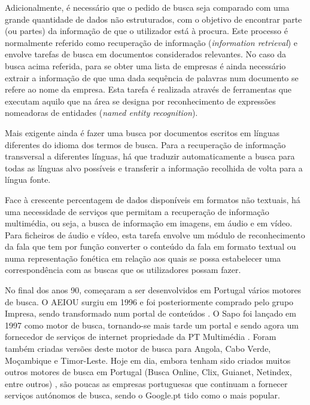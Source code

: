 \begin{multicols}{2}
Adicionalmente, é necessário que o pedido de busca seja comparado com uma grande quantidade de dados não estruturados,
com o objetivo de encontrar parte (ou partes) da informação de que o utilizador está à procura. 
Este processo é normalmente referido como recuperação de informação (\textit{information retrieval}) 
e envolve tarefas de busca em documentos considerados relevantes. 
No caso da busca acima referida, para se obter uma lista de empresas é ainda necessário extrair a informação 
de que uma dada sequência de palavras num documento se refere ao nome da empresa. 
Esta tarefa é realizada através de ferramentas que executam aquilo que na área se designa por 
reconhecimento de expressões nomeadoras de entidades (\textit{named entity recognition}).


Mais exigente ainda é fazer uma busca por documentos escritos em línguas diferentes do idioma dos termos de busca. 
Para a recuperação de informação transversal a diferentes línguas, há que traduzir automaticamente a busca para todas as línguas alvo possíveis e transferir a informação recolhida de volta para a língua fonte. 

Face à crescente percentagem de dados disponíveis em formatos não textuais, há uma necessidade de serviços que permitam a recuperação de informação multimédia, 
ou seja, a busca de informação em imagens, em áudio e em vídeo. 
Para ficheiros de áudio e vídeo, esta tarefa envolve um módulo de reconhecimento da fala que tem por função converter o conteúdo da fala
em formato textual ou numa representação fonética em relação aos quais se possa estabelecer uma correspondência com as buscas
que os utilizadores possam fazer.

No final dos anos 90, começaram a ser desenvolvidos em Portugal vários motores de busca. 
O AEIOU surgiu em 1996 e foi posteriormente comprado pelo grupo Impresa, sendo transformado num portal de conteúdos \cite{aeiou}. 
O Sapo foi lançado em 1997 como motor de busca, tornando-se mais tarde um portal e sendo agora um fornecedor de serviços de internet propriedade da PT Multimédia \cite{sapo}. 
Foram também criadas versões deste motor de busca para Angola, Cabo Verde, Moçambique e Timor-Leste. 
Hoje em dia, embora tenham sido criados muitos outros motores de busca em Portugal (Busca Online, Clix, Guianet, Netindex, entre outros) \cite{colossus}, 
são poucas as empresas portuguesas que continuam a fornecer serviços autónomos de busca, sendo o Google.pt tido como o mais popular.


\end{multicols}
